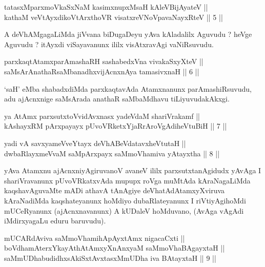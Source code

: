 \begin{shl}
tatasxMparxmoVkaSxNaM kasimxnupxMsaH kAleV\s BijAyateV || \\
kathaM veVtAyxdikoV\s tArxthoVR visatxreVNoVpavaNayxRteV \hfill || 5 ||
  
\end{shl}

\begin{artha}
A deVhAMgagaLiMda jiVvana biDugaDeyu yAva kAladalilx Aguvudu ? heVge
Aguvudu ? itAyxdi viSayavanunx ililx visAtxravAgi vaNiRsuvudu.
\end{artha}

\begin{shl}
parxkaqtAtamxparAmashaRH sashabedxVna vivakaSxyXteV || \\
saMsArAnathaRsaMbanadhxvijAcnxnAya tamasivxnaH \hfill || 6 ||
  
\end{shl}

\begin{artha}
`saH' eMba shabadxdiMda parxkaqtavAda Atamxnanunx parAmashiRsuvudu,
adu ajAcnxnige saMsArada anathaR saMbaMdhavu tiLiyuvudakAkxgi.
\end{artha}

\begin{shl}
ya AtAmx parxsutxtoV\s vidAvxnasx yadeVdaM shariVrakamf || \\
kAshayxRM pArxpayayx pUvoVRketxYjaRrAroVgAdiheVtuBiH \hfill || 7 ||
  
\end{shl}

\begin{shl}
yadi vA savxyameVveYtayx deVhABeVdatavxheVtutaH || \\
dwbaRlayxmeVvaM saMpArxpayx saMmoVhamiva yAtayxtha \hfill || 8 ||
  
\end{shl}

\begin{artha}
yAva Atamxnu ajAcnxniyAgiruvanoV avaneV ililx parxsutxtanAgidudx yAvAga
I shariVravanunx pUvoVRkatxvAda mupupx roVga muMtAda kAraNagaLiMda
kaqshavAguvaMte mADi athavA tAnAgiye deVhatAdAtamxyXviruva kAraNadiMda
kaqshateyanunx hoMdiyo dubaRlateyanunx I riVtiyAgihoMdi mUCeRyanunx
(ajAcnxnavanunx) A kUDaleV hoMduvano,  (AvAga vAgAdi iMdirxyagaLu eduru
baruvudu).
\end{artha}

\begin{shl}
mUCARdAviva saMmoVhamihApAyxtAmx nigacaCxti || \\
boVdhamAterxYkayAthAtAmxyXnAnxyaM saMmoVhaBAgayxtaH ||  \\
saMmUDhabudidhxsAkiSxtAvxtasxMmUDha iva BAtayxtaH \hfill || 9 ||
  
\end{shl}

